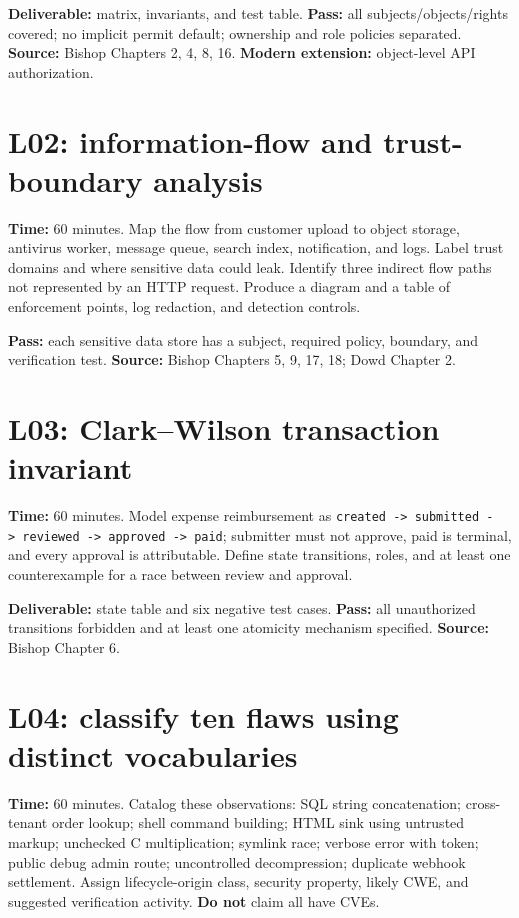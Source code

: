 \documentclass[
  letterpaper,
]{article}
\begin{document}
\textbf{Deliverable:} matrix, invariants, and test table. \textbf{Pass:}
all subjects/objects/rights covered; no implicit permit default;
ownership and role policies separated. \textbf{Source:} Bishop Chapters
2, 4, 8, 16. \textbf{Modern extension:} object-level API authorization.

\section{L02: information-flow and trust-boundary
analysis}\label{l02-information-flow-and-trust-boundary-analysis}

\textbf{Time:} 60 minutes. Map the flow from customer upload to object
storage, antivirus worker, message queue, search index, notification,
and logs. Label trust domains and where sensitive data could leak.
Identify three indirect flow paths not represented by an HTTP request.
Produce a diagram and a table of enforcement points, log redaction, and
detection controls.

\textbf{Pass:} each sensitive data store has a subject, required policy,
boundary, and verification test. \textbf{Source:} Bishop Chapters 5, 9,
17, 18; Dowd Chapter 2.

\section{L03: Clark--Wilson transaction
invariant}\label{l03-clarkwilson-transaction-invariant}

\textbf{Time:} 60 minutes. Model expense reimbursement as
\texttt{created\ -\textgreater{}\ submitted\ -\textgreater{}\ reviewed\ -\textgreater{}\ approved\ -\textgreater{}\ paid};
submitter must not approve, paid is terminal, and every approval is
attributable. Define state transitions, roles, and at least one
counterexample for a race between review and approval.

\textbf{Deliverable:} state table and six negative test cases.
\textbf{Pass:} all unauthorized transitions forbidden and at least one
atomicity mechanism specified. \textbf{Source:} Bishop Chapter 6.

\section{L04: classify ten flaws using distinct
vocabularies}\label{l04-classify-ten-flaws-using-distinct-vocabularies}

\textbf{Time:} 60 minutes. Catalog these observations: SQL string
concatenation; cross-tenant order lookup; shell command building; HTML
sink using untrusted markup; unchecked C multiplication; symlink race;
verbose error with token; public debug admin route; uncontrolled
decompression; duplicate webhook settlement. Assign lifecycle-origin
class, security property, likely CWE, and suggested verification
activity. \textbf{Do not} claim all have CVEs.
\end{document}
